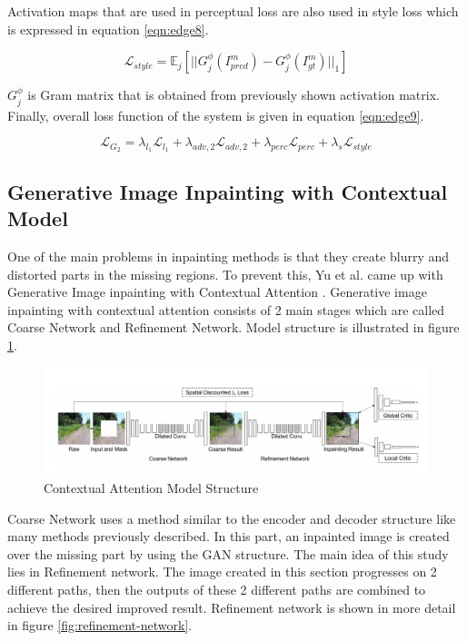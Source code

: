 Activation maps that are used in perceptual loss are also used in style loss which is expressed in equation \ref{eqn:edge8}.

\begin{equation}
\label{eqn:edge8}
    \mathcal{L}_{style} = \mathbb{E}_j [ || G_j^{\phi} (I^m_{pred})- G_j^{\phi} (I^m_{gt}) ||_1 ]
\end{equation}

\(G_j^\phi\) is Gram matrix that is obtained from previously shown activation matrix. Finally, overall loss function of the system is given in equation \ref{eqn:edge9}.

\begin{equation}
\label{eqn:edge9}
    \mathcal{L}_{G_2}=\lambda_{l_1}\mathcal{L}_{l_1} + \lambda_{adv,2}\mathcal{L}_{adv,2} + \lambda_{perc}\mathcal{L}_{perc} + \lambda_{s}\mathcal{L}_{style}
\end{equation}

\subsection{Generative Image Inpainting with Contextual Model}

One of the main problems in inpainting methods is that they create blurry and distorted parts in the missing regions. To prevent this, Yu et al. came up with Generative Image inpainting with Contextual Attention \cite{generative_contextual}.
Generative image inpainting with contextual attention consists of 2 main stages which are called Coarse Network and Refinement Network. Model structure is illustrated in figure \ref{fig:contextual-structure}.

\begin{figure}[h!]
    \centering
    \includegraphics[scale=0.5]{figures/chapter4/GenerativeOverview.PNG}
    \vspace*{3mm}
    \caption{Contextual Attention Model Structure \cite{generative_contextual}}
    \label{fig:contextual-structure}
\end{figure}

Coarse Network uses a method similar to the encoder and decoder structure like many methods previously described. In this part, an inpainted image is created over the missing part by using the GAN structure. \newline
The main idea of this study lies in Refinement network. The image created in this section progresses on 2 different paths, then the outputs of these 2 different paths are combined to achieve the desired improved result. Refinement network is shown in more detail in figure \ref{fig:refinement-network}.

